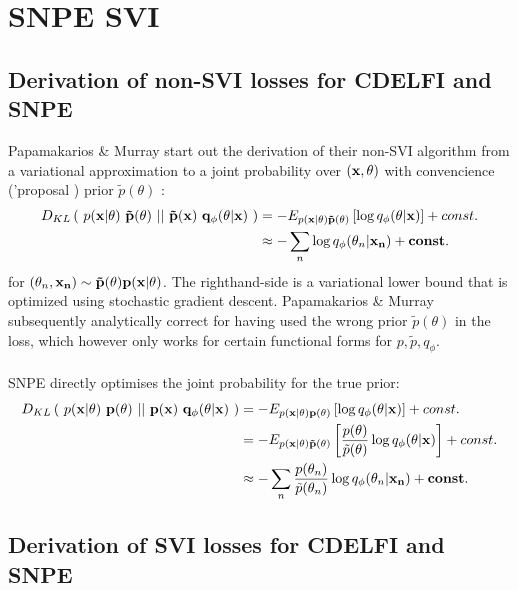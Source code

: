 \documentclass[10pt,english]{article}
\begin{document}
\section{SNPE SVI}
\label{seq:SVI_SNPV_vs_CDELFI}

\subsection{Derivation of non-SVI losses for CDELFI and SNPE}
Papamakarios \& Murray start out the derivation of their non-SVI algorithm from a variational approximation to a joint probability over $(\bf{x}, \theta)$ with convencience ('proposal
) prior $\tilde{p}(\theta)$ :
\begin{align}
D_{KL}\left( \ p(\bf{x}|\theta) \ \tilde{p}(\theta) \ || \ \tilde{p}(\bf{x}) \ q_\phi(\theta|\bf{x}) \ \right) &= - E_{p(\bf{x}|\theta)\tilde{p}(\theta)}\left[ \log q_\phi(\theta | \bf{x}) \right] + const. \nonumber \\
&\approx - \sum_n \log q_\phi(\theta_n | \bf{x}_n) \nonumber + const.
\end{align}
for $(\theta_n, \bf{x}_n) \sim \tilde{p}(\theta) p(\bf{x}|\theta)$.
The righthand-side is a variational lower bound that is optimized using stochastic gradient descent. 
Papamakarios \& Murray subsequently analytically correct for having used the wrong prior $\tilde{p}(\theta)$ in the loss, which however only works for certain functional forms for $p, \tilde{p}, q_\phi$.

\paragraph{}\noindent{}SNPE directly optimises the joint probability for the true prior:
\begin{align}
D_{KL}\left( \ p(\bf{x}|\theta) \ p(\theta) \ || \ p(\bf{x}) \ q_\phi(\theta|\bf{x}) \ \right) &= - E_{p(\bf{x}|\theta)p(\theta)}\left[ \log q_\phi(\theta | \bf{x}) \right] + const. \nonumber \\
&= - E_{p(\bf{x}|\theta)\tilde{p}(\theta)}\left[ \frac{p(\theta)}{\tilde{p}(\theta)} \log q_\phi(\theta | \bf{x}) \right] + const. \nonumber \\
&\approx - \sum_n \frac{p(\theta_n)}{\tilde{p}(\theta_n)} \log q_\phi(\theta_n | \bf{x}_n) + const. \nonumber
\end{align}

\subsection{Derivation of SVI losses for CDELFI and SNPE}
\end{document}
